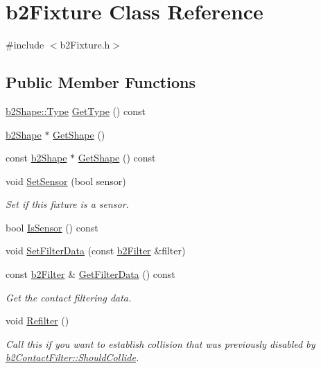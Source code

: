 \hypertarget{classb2_fixture}{}\section{b2\+Fixture Class Reference}
\label{classb2_fixture}


{\ttfamily \#include $<$b2\+Fixture.\+h$>$}

\subsection*{Public Member Functions}
\begin{DoxyCompactItemize}
\item 
\mbox{\hyperlink{classb2_shape_a4c1f3a9ad6b3150bb90ad9018ca4b1e0}{b2\+Shape\+::\+Type}} \mbox{\hyperlink{classb2_fixture_a7a566c1e3b768f6a72ebc3b758aad70e}{Get\+Type}} () const
\item 
\mbox{\hyperlink{classb2_shape}{b2\+Shape}} $\ast$ \mbox{\hyperlink{classb2_fixture_aaa2b73fa212fa53b1c800cccd7a1d31e}{Get\+Shape}} ()
\item 
const \mbox{\hyperlink{classb2_shape}{b2\+Shape}} $\ast$ \mbox{\hyperlink{classb2_fixture_a783f8bcb19eee659686284872e70f383}{Get\+Shape}} () const
\item 
void \mbox{\hyperlink{classb2_fixture_a6198a81dcee0fe814d730383ebfa7038}{Set\+Sensor}} (bool sensor)
\begin{DoxyCompactList}\small\item\em Set if this fixture is a sensor. \end{DoxyCompactList}\item 
bool \mbox{\hyperlink{classb2_fixture_aedd23d27ff7ce2d53b6c5b7a878a35d3}{Is\+Sensor}} () const
\item 
void \mbox{\hyperlink{classb2_fixture_a2c5e0d12c174927a4ad550459be334ad}{Set\+Filter\+Data}} (const \mbox{\hyperlink{structb2_filter}{b2\+Filter}} \&filter)
\item 
const \mbox{\hyperlink{structb2_filter}{b2\+Filter}} \& \mbox{\hyperlink{classb2_fixture_ad956250d9f684a407992ec178320127e}{Get\+Filter\+Data}} () const
\begin{DoxyCompactList}\small\item\em Get the contact filtering data. \end{DoxyCompactList}\item 
void \mbox{\hyperlink{classb2_fixture_a45d3320f94811d67383c48466165fa26}{Refilter}} ()
\begin{DoxyCompactList}\small\item\em Call this if you want to establish collision that was previously disabled by \mbox{\hyperlink{classb2_contact_filter_aac8f6155d1f577d125db587f5269289b}{b2\+Contact\+Filter\+::\+Should\+Collide}}. \end{DoxyCompactList}\item 

\end{DoxyCompactItemize}
